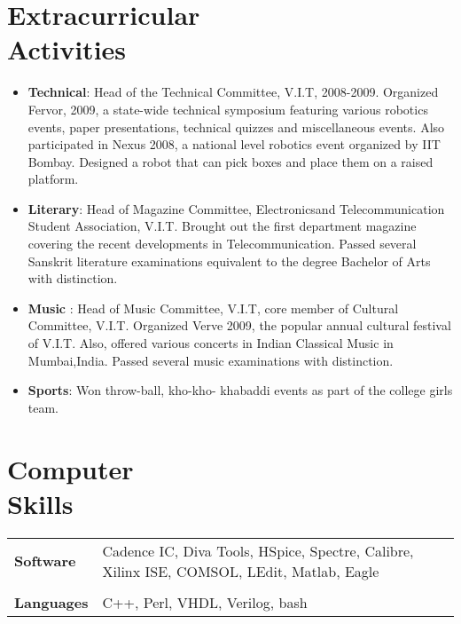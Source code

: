 \documentclass[margin]{res}
\begin{document}
\begin{resume}
\section{Extracurricular \\ Activities}
\begin{itemize}
\item
{\bf Technical}: Head of the Technical Committee, V.I.T, 2008-2009. Organized Fervor, 2009, a state-wide technical symposium featuring various robotics events, paper presentations, technical quizzes and miscellaneous events. Also participated in Nexus 2008, a national level robotics event organized by IIT Bombay. Designed a robot that can pick boxes and place them on a raised platform.
\item
{\bf Literary}: Head of Magazine Committee, Electronicsand Telecommunication Student Association, V.I.T. Brought out the first department 
magazine covering the recent developments in Telecommunication. Passed several Sanskrit literature examinations equivalent to the degree Bachelor of Arts with distinction.
\item
{\bf Music} : Head of Music Committee, V.I.T, core member of Cultural Committee, V.I.T. Organized Verve 2009, the popular annual cultural festival of V.I.T. Also, offered various concerts in Indian Classical Music in Mumbai,India. Passed several music examinations with distinction.
\item
{\bf Sports}: Won throw-ball, kho-kho- khabaddi events as part of the college girls team.
\end{itemize}
\section{Computer \\ Skills}
   \begin{tabular}{l p{3.5in}}
        {\bf Software} &  Cadence IC, Diva Tools, HSpice, Spectre, Calibre, Xilinx ISE, COMSOL, LEdit, Matlab, Eagle \\\\
    {\bf Languages} & C++, Perl, VHDL, Verilog, bash
 \end{tabular}


\end{resume} 
\end{document}
